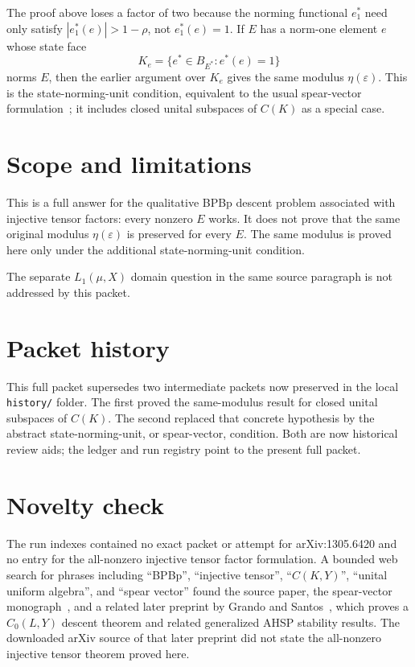 \documentclass[11pt]{article}
\newcommand{\eps}{\varepsilon}
\begin{document}
The proof above loses a factor of two because the norming functional
$e_1^\ast$ need only satisfy $|e_1^\ast(e)|>1-\rho$, not $e_1^\ast(e)=1$.
If $E$ has a norm-one element $e$ whose state face
\[
K_e=\{e^\ast\in B_{E^\ast}:e^\ast(e)=1\}
\]
norms $E$, then the earlier argument over $K_e$ gives the same modulus
$\eta(\eps)$.  This is the state-norming-unit condition, equivalent to the
usual spear-vector formulation~\cite{KMMPO}; it includes closed unital
subspaces of $C(K)$ as a special case.

\section*{Scope and limitations}

This is a full answer for the qualitative BPBp descent problem associated with
injective tensor factors: every nonzero $E$ works.  It does not prove that the
same original modulus $\eta(\eps)$ is preserved for every $E$.  The same
modulus is proved here only under the additional state-norming-unit condition.

The separate $L_1(\mu,X)$ domain question in the same source paragraph is not
addressed by this packet.

\section*{Packet history}

This full packet supersedes two intermediate packets now preserved in the
local \texttt{history/} folder.  The first proved the same-modulus result for
closed unital subspaces of \(C(K)\).  The second replaced that concrete
hypothesis by the abstract state-norming-unit, or spear-vector, condition.
Both are now historical review aids; the ledger and run registry point to the
present full packet.

\section*{Novelty check}

The run indexes contained no exact packet or attempt for arXiv:1305.6420 and
no entry for the all-nonzero injective tensor factor formulation.  A bounded
web search for phrases including ``BPBp'', ``injective tensor'', ``$C(K,Y)$'',
``unital uniform algebra'', and ``spear vector'' found the source paper, the
spear-vector monograph~\cite{KMMPO}, and a related later preprint by Grando and
Santos~\cite{GS}, which proves a $C_0(L,Y)$ descent theorem and related
generalized AHSP stability results.  The downloaded arXiv source of that later
preprint did not state the all-nonzero injective tensor theorem proved here.
\end{document}

